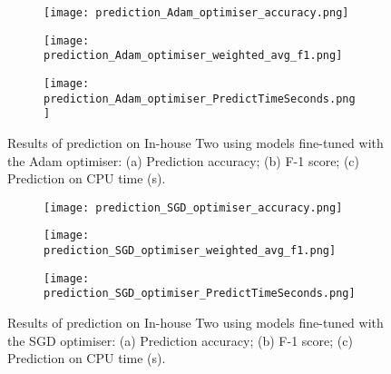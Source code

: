 \documentclass[a4paper,12pt]{article}
\newcommand{\figwidthh}{0.48\textwidth}
\begin{document}
\begin{figure}[h!] 
	\begin{center}
		\begin{subfigure}[b]{\figwidthh}
			\caption{} 
			\texttt{[image: prediction\_Adam\_optimiser\_accuracy.png]}
		\end{subfigure}
        \hfill
		\begin{subfigure}[b]{\figwidthh}
			\caption{}
			\texttt{[image: prediction\_Adam\_optimiser\_weighted\_avg\_f1.png]}
		\end{subfigure}
        \hfill
		\begin{subfigure}[b]{\figwidthh}
			\caption{}
			\texttt{[image: prediction\_Adam\_optimiser\_PredictTimeSeconds.png]}
		\end{subfigure}
	\end{center}
	\caption{Results of prediction on In-house Two using models fine-tuned with the Adam optimiser: 
	(a) Prediction accuracy; (b) F-1 score; (c) Prediction on CPU time (s).
	} 
	\label{fig:res_prdict_adam}
\end{figure}


\begin{figure}[h!] 
	\begin{center}
		\begin{subfigure}[b]{\figwidthh}
			\caption{} 
			\texttt{[image: prediction\_SGD\_optimiser\_accuracy.png]}
		\end{subfigure}
        \hfill
		\begin{subfigure}[b]{\figwidthh}
			\caption{}
			\texttt{[image: prediction\_SGD\_optimiser\_weighted\_avg\_f1.png]}
		\end{subfigure}
        \hfill
		\begin{subfigure}[b]{\figwidthh}
			\caption{}
			\texttt{[image: prediction\_SGD\_optimiser\_PredictTimeSeconds.png]}
		\end{subfigure}
	\end{center}
	\caption{Results of prediction on In-house Two using models fine-tuned with the SGD optimiser: 
	(a) Prediction accuracy; (b) F-1 score; (c) Prediction on CPU time (s).
	} 
	\label{fig:res_predict_SGD}
\end{figure}

\clearpage



\end{document}
